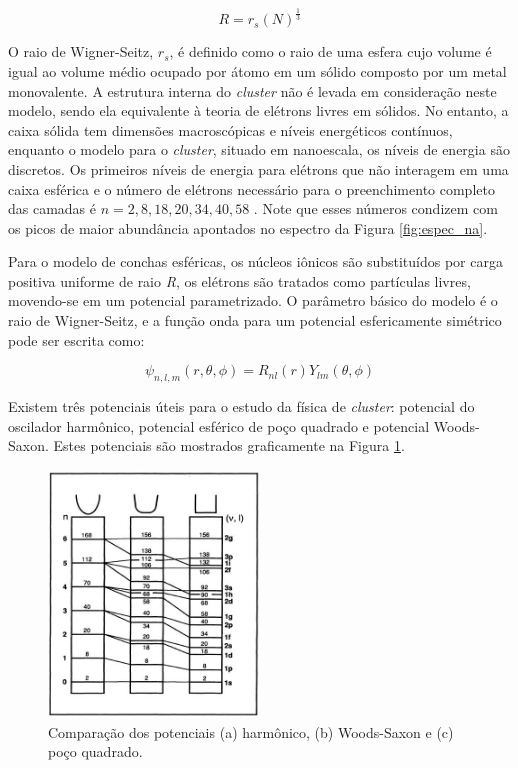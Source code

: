 \begin{equation}
\label{eq:raio_R}
    R = r_{s}(N)^{\frac{1}{3}}
\end{equation}

O raio de Wigner-Seitz, $r_{s}$, é definido como o raio de uma esfera cujo volume é igual ao volume médio ocupado por átomo em um sólido composto por um metal monovalente.
A estrutura interna do \textit{cluster} não é levada em consideração neste modelo, sendo ela equivalente à teoria de elétrons livres em sólidos. No entanto, a caixa sólida tem dimensões macroscópicas e níveis energéticos contínuos, enquanto o modelo para o \textit{cluster}, situado em nanoescala, os níveis de energia são discretos. Os primeiros níveis de energia para elétrons que não interagem em uma caixa esférica e o número de elétrons necessário para o preenchimento completo das camadas é $n= 2,8,18,20,34,40,58$ \cite{livro_cap16_Misra2012527}. Note que esses números condizem com os picos de maior abundância apontados no espectro da Figura \ref{fig:espec_na}.






Para o modelo de conchas esféricas, os núcleos iônicos são substituídos por carga positiva uniforme de raio \textit{R}, os elétrons são tratados como partículas livres, movendo-se em um potencial parametrizado. O parâmetro básico do modelo é o raio de Wigner-Seitz, e a função onda para um potencial esfericamente simétrico pode ser escrita como:

\begin{equation}
    \psi_{ n,l,m}(r, \theta, \phi) = R_{nl}(r)Y_{lm}(\theta, \phi)
\end{equation}

Existem três potenciais úteis para o estudo da física de \textit{cluster}: potencial do oscilador harmônico, potencial esférico de poço quadrado e potencial Woods-Saxon. Estes potenciais são mostrados graficamente na Figura \ref{fig:pocos}. 

\begin{figure}
  \centering
  \includegraphics[width=0.5\textwidth]{images/clusters/pocos}
  \caption{Comparação dos potenciais (a) harmônico, (b) Woods-Saxon e (c) poço quadrado. \cite{Heer}}
  \label{fig:pocos}
\end{figure}

